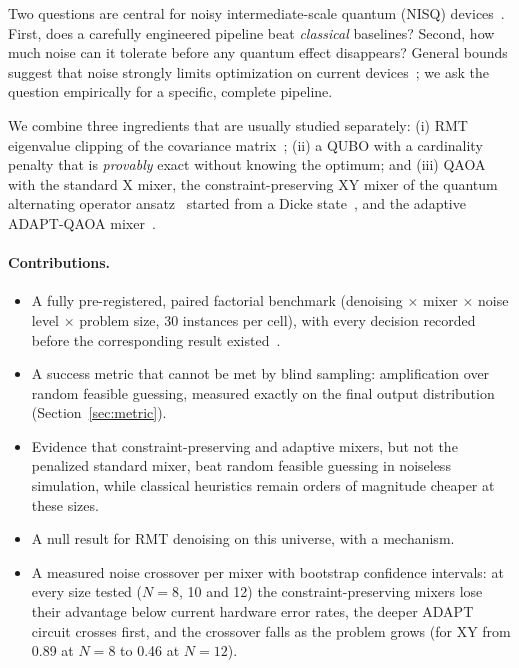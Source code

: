 \documentclass[11pt]{article}
\begin{document}
Two questions are central for noisy intermediate-scale quantum (NISQ) devices~\citep{preskill2018}.
First, does a carefully engineered pipeline beat \emph{classical} baselines? Second, how much
noise can it tolerate before any quantum effect disappears? General bounds suggest that noise
strongly limits optimization on current devices~\citep{stilckfranca2021}; we ask the question
empirically for a specific, complete pipeline.

We combine three ingredients that are usually studied separately: (i) RMT eigenvalue clipping of
the covariance matrix~\citep{laloux1999,bun2017}; (ii) a QUBO with a cardinality penalty that is
\emph{provably} exact without knowing the optimum; and (iii) QAOA with the standard X mixer, the
constraint-preserving XY mixer of the quantum alternating operator ansatz~\citep{hadfield2019,wang2020xy}
started from a Dicke state~\citep{bartschi2019dicke}, and the adaptive ADAPT-QAOA mixer~\citep{zhu2022adapt}.

\paragraph{Contributions.}
\begin{itemize}
  \item A fully pre-registered, paired factorial benchmark (denoising $\times$ mixer $\times$ noise
        level $\times$ problem size, 30 instances per cell), with every decision recorded before the
        corresponding result existed~\citep{nosek2018}.
  \item A success metric that cannot be met by blind sampling: amplification over random feasible
        guessing, measured exactly on the final output distribution (Section~\ref{sec:metric}).
  \item Evidence that constraint-preserving and adaptive mixers, but not the penalized standard
        mixer, beat random feasible guessing in noiseless simulation, while classical heuristics
        remain orders of magnitude cheaper at these sizes.
  \item A null result for RMT denoising on this universe, with a mechanism.
  \item A measured noise crossover per mixer with bootstrap confidence intervals: at every size
        tested ($N=8$, 10 and 12) the constraint-preserving mixers lose their advantage below
        current hardware error rates, the deeper ADAPT circuit crosses first, and the crossover
        falls as the problem grows (for XY from 0.89 at $N=8$ to 0.46 at $N=12$).
\end{itemize}
\end{document}
